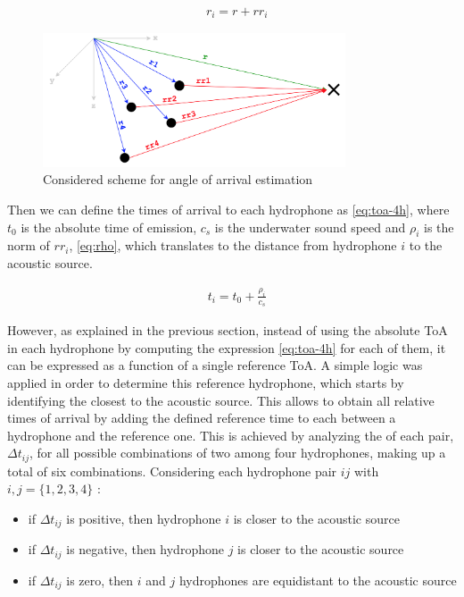\begin{eqnarray}
& r_i = r + rr_i
\label{eq:sum-vec}
\end{eqnarray}

\begin{figure}[!htbp]
	\centering
	\includegraphics[width=0.8\textwidth]{figures/AoA-init}
	\captionsetup{justification=centering,margin=2cm}
	\caption{Considered scheme for angle of arrival estimation}
	\label{fig:AoA-init}
\end{figure}

Then we can define the times of arrival to each hydrophone as \ref{eq:toa-4h}, where $t_0$ is the absolute time of emission, $c_s$ is the underwater sound speed and $\rho_i$ is the norm of $rr_i$, \ref{eq:rho}, which translates to the distance from hydrophone $i$ to the acoustic source. 

\begin{eqnarray}
& t_i = t_0 +  \frac{\rho_i}{c_s}
\label{eq:toa-4h}
\end{eqnarray}

 However, as explained in the previous section, instead of using the absolute ToA in each hydrophone by computing the expression \ref{eq:toa-4h} for each of them, it can be expressed as a function of a single reference ToA. A simple logic was applied in order to determine this reference hydrophone, which starts by identifying the closest to the acoustic source. This allows to obtain all relative times of arrival by adding the defined reference time to each  between a hydrophone and the reference one. This is achieved by analyzing the  of each pair, $ \Delta t_{ij}$, for all possible combinations of two among four hydrophones, making up a total of six combinations. Considering each hydrophone pair $ij$ with $i, j= \{1,2,3,4\}$ :
 
 \begin{itemize}
 	\item if $ \Delta t_{ij}$ is positive, then hydrophone $i$ is closer to the acoustic source
 	\item if $ \Delta t_{ij}$ is negative, then hydrophone $j$ is closer to the acoustic source
 	\item if $ \Delta t_{ij}$ is zero, then $i$ and $j$ hydrophones are equidistant to the acoustic source
 \end{itemize}
 
